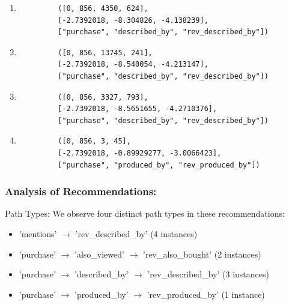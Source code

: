 \begin{enumerate}
    \item \begin{center}
	{\footnotesize
	\begin{verbatim}
		 ([0, 856, 4350, 624],
		 [-2.7392018, -8.304826, -4.138239],
		 ["purchase", "described_by", "rev_described_by"])
	\end{verbatim}
	}
	\end{center}

    \item \begin{center}
	{\footnotesize
	\begin{verbatim}
		 ([0, 856, 13745, 241],
		 [-2.7392018, -8.540054, -4.213147],
		 ["purchase", "described_by", "rev_described_by"])
	\end{verbatim}
	}
	\end{center}

    \item \begin{center}
	{\footnotesize
	\begin{verbatim}
		 ([0, 856, 3327, 793],
		 [-2.7392018, -8.5651655, -4.2710376],
		 ["purchase", "described_by", "rev_described_by"])
	\end{verbatim}
	}
	\end{center}

    \item \begin{center}
	{\footnotesize
	\begin{verbatim}
		 ([0, 856, 3, 45],
		 [-2.7392018, -0.89929277, -3.0066423],
		 ["purchase", "produced_by", "rev_produced_by"])
	\end{verbatim}
	}
	\end{center}
\end{enumerate}

\subsubsection*{Analysis of Recommendations:}
Path Types: We observe four distinct path types in these recommendations:
\begin{itemize}
	\item 'mentions' $\rightarrow$ 'rev\_described\_by' (4 instances)

	\item 'purchase' $\rightarrow$ 'also\_viewed' $\rightarrow$ 'rev\_also\_bought'
		(2 instances)

	\item 'purchase' $\rightarrow$ 'described\_by' $\rightarrow$ 'rev\_described\_by'
		(3 instances)

	\item 'purchase' $\rightarrow$ 'produced\_by' $\rightarrow$ 'rev\_produced\_by'
		(1 instance)
\end{itemize}


